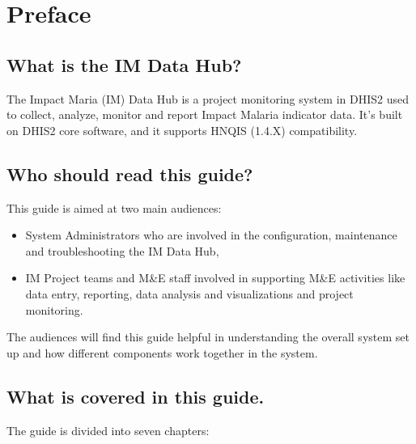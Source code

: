 \documentclass[]{book}
\providecommand{\tightlist}{%
  \setlength{\itemsep}{0pt}\setlength{\parskip}{0pt}}
\begin{document}
\hypertarget{preface}{%
\chapter*{Preface}\label{preface}}

\hypertarget{what-is-the-im-data-hub}{%
\section{What is the IM Data Hub?}\label{what-is-the-im-data-hub}}

The Impact Maria (IM) Data Hub is a project monitoring system in DHIS2 used to collect, analyze, monitor and report Impact Malaria indicator data. It's built on DHIS2 core software, and it supports HNQIS (1.4.X) compatibility.

\hypertarget{who-should-read-this-guide}{%
\section{Who should read this guide?}\label{who-should-read-this-guide}}

This guide is aimed at two main audiences:

\begin{itemize}
\tightlist
\item
  System Administrators who are involved in the configuration, maintenance and troubleshooting the IM Data Hub,
\item
  IM Project teams and M\&E staff involved in supporting M\&E activities like data entry, reporting, data analysis and visualizations and project monitoring.
\end{itemize}

The audiences will find this guide helpful in understanding the overall system set up and how different components work together in the system.

\hypertarget{what-is-covered-in-this-guide.}{%
\section{What is covered in this guide.}\label{what-is-covered-in-this-guide.}}

The guide is divided into seven chapters:
\end{document}
